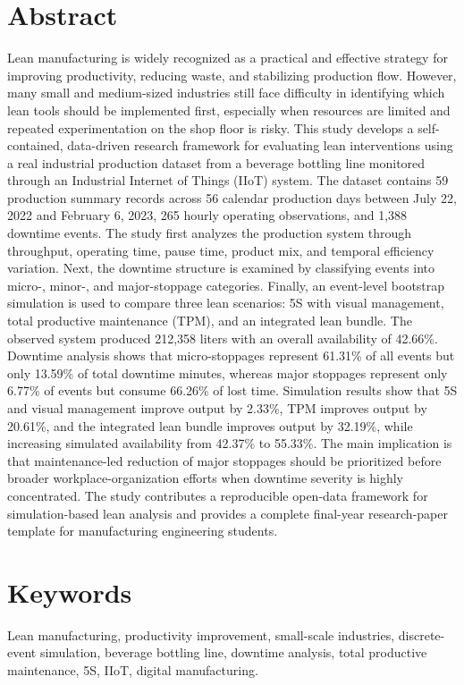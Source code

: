 \documentclass[12pt,a4paper]{article}
\begin{document}
\section*{Abstract}
Lean manufacturing is widely recognized as a practical and effective strategy for improving productivity, reducing waste, and stabilizing production flow. However, many small and medium-sized industries still face difficulty in identifying which lean tools should be implemented first, especially when resources are limited and repeated experimentation on the shop floor is risky. This study develops a self-contained, data-driven research framework for evaluating lean interventions using a real industrial production dataset from a beverage bottling line monitored through an Industrial Internet of Things (IIoT) system. The dataset contains 59 production summary records across 56 calendar production days between July 22, 2022 and February 6, 2023, 265 hourly operating observations, and 1,388 downtime events. The study first analyzes the production system through throughput, operating time, pause time, product mix, and temporal efficiency variation. Next, the downtime structure is examined by classifying events into micro-, minor-, and major-stoppage categories. Finally, an event-level bootstrap simulation is used to compare three lean scenarios: 5S with visual management, total productive maintenance (TPM), and an integrated lean bundle. The observed system produced 212,358 liters with an overall availability of 42.66\%. Downtime analysis shows that micro-stoppages represent 61.31\% of all events but only 13.59\% of total downtime minutes, whereas major stoppages represent only 6.77\% of events but consume 66.26\% of lost time. Simulation results show that 5S and visual management improve output by 2.33\%, TPM improves output by 20.61\%, and the integrated lean bundle improves output by 32.19\%, while increasing simulated availability from 42.37\% to 55.33\%. The main implication is that maintenance-led reduction of major stoppages should be prioritized before broader workplace-organization efforts when downtime severity is highly concentrated. The study contributes a reproducible open-data framework for simulation-based lean analysis and provides a complete final-year research-paper template for manufacturing engineering students.

\section*{Keywords}
Lean manufacturing, productivity improvement, small-scale industries, discrete-event simulation, beverage bottling line, downtime analysis, total productive maintenance, 5S, IIoT, digital manufacturing.
\end{document}

